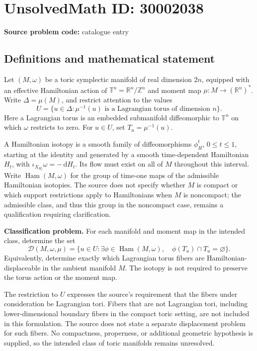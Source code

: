 \documentclass[11pt]{article}
\newcommand{\Z}{\mathbb{Z}}
\newcommand{\R}{\mathbb{R}}
\newcommand{\dd}{\,\mathrm{d}}
\begin{document}
\section*{UnsolvedMath ID: 30002038}
\textbf{Source problem code:} catalogue entry
\subsection{Definitions and mathematical statement}
Let \((M,\omega)\) be a toric symplectic manifold of real dimension \(2n\), equipped with an effective Hamiltonian action of \(\mathbb T^n=\R^n/\Z^n\) and moment map \(\mu:M\to(\R^n)^*\). Write \(\Delta=\mu(M)\), and restrict attention to the values
\[
U=\{u\in\Delta:\mu^{-1}(u)\text{ is a Lagrangian torus of dimension }n\}.
\]
Here a Lagrangian torus is an embedded submanifold diffeomorphic to \(\mathbb T^n\) on which \(\omega\) restricts to zero. For \(u\in U\), set \(T_u=\mu^{-1}(u)\).

A Hamiltonian isotopy is a smooth family of diffeomorphisms \(\phi_H^t\), \(0\leq t\leq1\), starting at the identity and generated by a smooth time-dependent Hamiltonian \(H_t\), with \(\iota_{X_{H_t}}\omega=-\dd H_t\). Its flow must exist on all of \(M\) throughout this interval. Write \(\operatorname{Ham}(M,\omega)\) for the group of time-one maps of the admissible Hamiltonian isotopies. The source does not specify whether \(M\) is compact or which support restrictions apply to Hamiltonians when \(M\) is noncompact; the admissible class, and thus this group in the noncompact case, remains a qualification requiring clarification.

\textbf{Classification problem.} For each manifold and moment map in the intended class, determine the set
\[
\mathcal D(M,\omega,\mu)
=\bigl\{u\in U:\exists\phi\in\operatorname{Ham}(M,\omega),\quad
\phi(T_u)\cap T_u=\varnothing\bigr\}.
\]
Equivalently, determine exactly which Lagrangian torus fibers are Hamiltonian-displaceable in the ambient manifold \(M\). The isotopy is not required to preserve the torus action or the moment map.

The restriction to \(U\) expresses the source's requirement that the fibers under consideration be Lagrangian tori. Fibers that are not Lagrangian tori, including lower-dimensional boundary fibers in the compact toric setting, are not included in this formulation. The source does not state a separate displacement problem for such fibers. No compactness, properness, or additional geometric hypothesis is supplied, so the intended class of toric manifolds remains unresolved.
\end{document}
